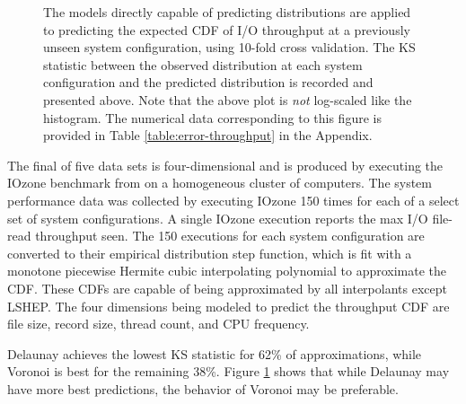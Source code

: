 \documentclass[smallextended,final]{svjour3}       %
\begin{document}
\begin{figure}
  \centering
  \caption{The models directly capable of predicting distributions are
  applied to predicting the expected CDF of I/O throughput at a previously
  unseen system configuration, using 10-fold cross validation. The KS
  statistic between the observed distribution at each system configuration
  and the predicted distribution is recorded and presented above. Note
  that the above plot is \textit{not} log-scaled like the histogram. The
  numerical data corresponding to this figure is provided in Table
  \ref{table:error-throughput} in the Appendix.}
\label{fig:error-throughput}
\end{figure}

The final of five data sets is four-dimensional and is produced by executing
the IOzone benchmark from \cite{iozone} on a homogeneous cluster of
computers. The system performance data was collected by executing IOzone
150 times for each of a select set of system configurations. A single
IOzone execution reports the max I/O file-read throughput seen. The 150
executions for each system configuration are converted to their empirical
distribution step function, which is fit with a monotone piecewise Hermite
cubic interpolating polynomial \cite{fritsch1980monotone} to approximate
the CDF. These CDFs are capable of being approximated by all interpolants
except LSHEP. The four dimensions being modeled to predict the throughput
CDF are file size, record size, thread count, and CPU frequency.

Delaunay achieves the lowest KS statistic for 62\% of approximations, while
Voronoi is best for the remaining 38\%. Figure \ref{fig:error-throughput}
shows that while Delaunay may have more best predictions, the behavior of
Voronoi may be preferable.
\end{document}
